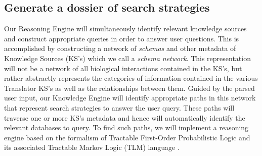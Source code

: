 \documentclass[11pt,notitlepage]{article}
\begin{document}
\subsection{Generate a dossier of search strategies}
Our Reasoning Engine will simultaneously identify relevant knowledge sources and construct appropriate queries in order to answer user questions. This is accomplished by constructing a network of \textit{schemas} and other metadata of Knowledge Sources (KS's) which we call a \textit{schema network}. This representation will not be a network of all biological interactions contained in the KS's, but rather abstractly represents the categories of information contained in the various Translator KS's as well as the relationships between them. Guided by the parsed user input, our Knowledge Engine will identify appropriate paths in this network that represent search strategies to answer the user query. These paths will traverse one or more KS's metadata and hence will automatically identify the relevant databases to query. To find such paths, we will implement a reasoning engine based on the formalism of Tractable First-Order Probabilistic Logic and its associated Tractable Markov Logic (TLM) language \citet{Domingos:2012wi}.
\end{document}
